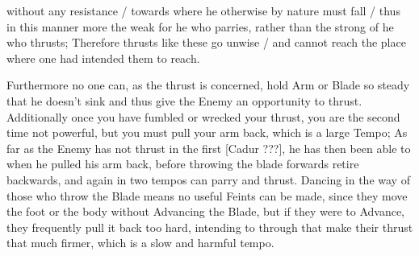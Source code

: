 \newpage


\newpage

%

without any resistance / towards where he otherwise by nature must
fall / thus in this manner more the weak for he who parries, rather
than the strong of he who thrusts; Therefore thrusts like these go
unwise / and cannot reach the place where one had intended them to reach.

Furthermore no one can, as the thrust is concerned, hold Arm or Blade
so steady that he doesn't sink and thus give the Enemy an opportunity
to thrust. Additionally once you have fumbled or wrecked your thrust,
you are the second time not powerful, but you must pull your arm back,
which is a large Tempo; As far as the Enemy has not thrust in the
first [Cadur ???], he has then been able to when he pulled his arm
back, before throwing the blade forwards retire backwards, and again
in two tempos can parry and thrust. Dancing in the way of those who
throw the Blade means no useful Feints can be made, since they move
the foot or the body without Advancing the Blade, but if they were to
Advance, they frequently pull it back too hard, intending to through
that make their thrust that much firmer, which is a slow and harmful tempo.


